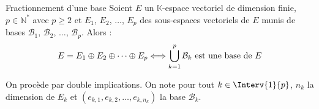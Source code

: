 \documentclass[a4paper,10pt]{report}
\newcommand{\Sum}[2]{\ensuremath{\textstyle{\sum\limits_{#1}^{#2}}}}
\begin{document}
\begin{Proposition}{Fractionnement d'une base}\label{UnionBase} Soient $E$ un $\mathbb{K}$-espace vectoriel de dimension finie, $p \in \mathbb{N}^*$ avec $p \geq 2$ et $E_1$, $E_2$, $\ldots$, $E_p$ des sous-espaces vectoriels de $E$ munis de bases $\mathcal{B}_1$, $\mathcal{B}_2$, $\ldots$, $\mathcal{B}_p$. Alors :
$$ E= E_1 \oplus E_2 \oplus \cdots \oplus E_p \Longleftrightarrow  \bigcup_{k=1}^p \mathcal{B}_k \hbox{ est une base de } E$$
\end{Proposition}

\begin{Demonstration}{} On procède par double implications. On note pour tout $k \in \Interv{1}{p}$, $n_k$ la dimension de $E_k$ et $(e_{k,1}, e_{k,2}, \ldots, e_{k,n_k})$ la base $\mathcal{B}_k$.

\medskip
%
%
%
%
%
\vspace{13cm}
\end{Demonstration}
\end{document}
